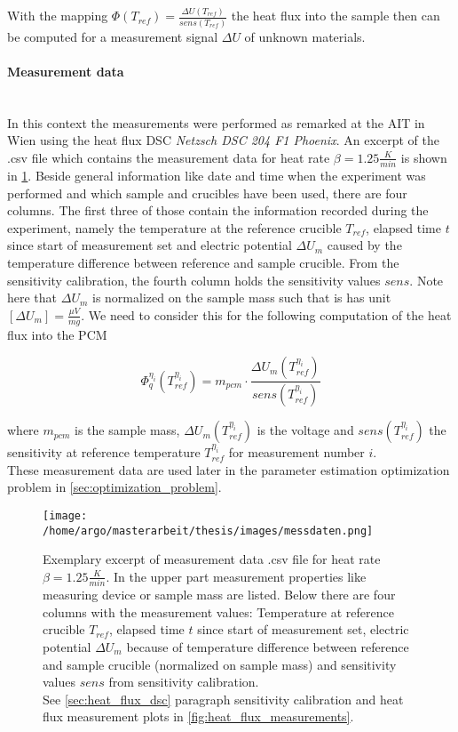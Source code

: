 \documentclass{scrartcl}[12pt, halfparskip]
\numberwithin{equation}{section}
\numberwithin{figure}{section}
\numberwithin{table}{section}
\begin{document}
With the mapping $\varPhi(T_{ref}) = \frac{\Delta U(T_{ref})}{sens(T_{ref})}$ the heat flux into the sample then can be computed for a measurement signal $\Delta U$ of unknown materials. 

\paragraph{Measurement data}\mbox{}\\
In this context the measurements were performed as remarked at the AIT in Wien using the heat flux DSC \textit{Netzsch DSC 204 F1 Phoenix\textsuperscript{\textregistered}}. An excerpt of the .csv file which contains the measurement data for heat rate ${\beta=1.25 \frac{K}{min}}$ is shown in \cref{fig:measurement_csv_data}. Beside general information like date and time when the experiment was performed and which sample and crucibles have been used, there are four columns. The first three of those contain the information recorded during the experiment, namely the temperature at the reference crucible $T_{ref}$, elapsed time $t$ since start of measurement set and electric potential $\Delta U_m$ caused by the temperature difference between reference and sample crucible. 
From the sensitivity calibration, the fourth column holds the sensitivity values $sens$.
Note here that $\Delta U_m$ is normalized on the sample mass such that is has unit $[\Delta U_m]=\frac{\mu V}{mg}$. We need to consider this for the following computation of the heat flux into the PCM

\begin{equation}
	\varPhi_q^{\eta_i}(T_{ref}^{\eta_i}) = m_{pcm} \cdot \frac{\Delta U_m(T_{ref}^{\eta_i})}{sens(T_{ref}^{\eta_i})}
\end{equation}

where $m_{pcm}$ is the sample mass, $\Delta U_m(T_{ref}^{\eta_i})$ is the voltage and $sens(T_{ref}^{\eta_i})$ the sensitivity at reference temperature $T_{ref}^{\eta_i}$ for measurement number $i$. \\
These measurement data are used later in the parameter estimation optimization problem in \cref{sec:optimization_problem}.


\begin{figure}[H]
	\centering
	\texttt{[image: /home/argo/masterarbeit/thesis/images/messdaten.png]}
	\caption{Exemplary excerpt of measurement data .csv file for heat rate $\beta=1.25 \frac{K}{min}$. In the upper part measurement properties like measuring device or sample mass are listed. Below there are four columns with the measurement values: Temperature at reference crucible $T_{ref}$, elapsed time $t$ since start of measurement set, electric potential $\Delta U_m$ because of temperature difference between reference and sample crucible (normalized on sample mass) and sensitivity values $sens$ from sensitivity calibration. \\
	See \cref{sec:heat_flux_dsc} paragraph sensitivity calibration and heat flux measurement plots in \cref{fig:heat_flux_measurements}.}
	\label{fig:measurement_csv_data}
\end{figure}
\end{document}
